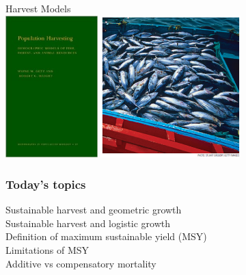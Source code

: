 \documentclass[color=usenames,dvipsnames,handout]{beamer}\usepackage[]{graphicx}\usepackage[]{color}
\begin{document}
\begin{frame}[plain]
  \begin{center}
    {\huge Harvest Models} \\
    \vfill
    \includegraphics[height=5.5cm,keepaspectratio]{figs/book} \hspace{0.3cm}
    \includegraphics[height=5.5cm,keepaspectratio]{figs/tuna}
  \end{center}
\end{frame}



\begin{frame}
  \frametitle{Today's topics}
  \large
  Sustainable harvest and geometric growth \\
  \vfill
  Sustainable harvest and logistic growth \\
  \vfill
  Definition of maximum sustainable yield (MSY) \\
  \vfill
  Limitations of MSY \\
  \vfill
  Additive vs compensatory mortality
\end{frame}
\end{document}
